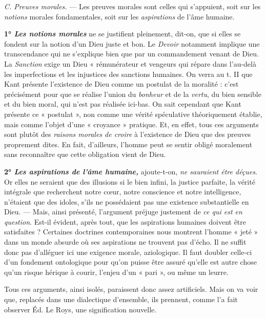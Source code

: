 {\it C. Preuves morales.} — Les preuves morales sont celles qui s’appuient,
soit sur les {\it notions} morales fondamentales, soit sur les {\it aspirations}
de l’âme humaine.

\vspace{0.24cm}
{\footnotesize
\textbf{1° \textit {\textsf{Les notions morales}}}
ne se justifient pleinement, dit-on, que si elles se
fondent sur la notion d’un Dieu juste et bon. Le {\it Devoir} notamment implique
une transcendance qui ne s'explique bien que par un commandement
venant de Dieu. La {\it Sanction} exige un Dieu « rémunérateur et vengeurs qui
répare dans l'au-delà les imperfections et les injustices des sanctions
humaines. On verra au t. II que Kant présente l’existence de Dieu comme
un postulat de la moralité : c’est précisément pour que se réalise l’union
du {\it bonheur} et de la {\it vertu}, du bien sensible et du bien moral, qui n’est pas
réalisée ici-bas. On sait cependant que Kant présente ce « postulat », non
comme une vérité spéculative théoriquement établie, mais comme l’objet
d’une « croyance » pratique. Et, en effet, tous ces arguments sont plutôt
des {\it raisons morales de croire} à l’existence de Dieu que des preuves proprement
dites. En fait, d’ailleurs, l’homme peut se sentir obligé moralement
sans reconnaître que cette obligation vient de Dieu.

\textbf{2° \textit {\textsf{Les aspirations de l'âme humaine,}}}
 ajoute-t-on, {\it ne sauraient étre déçues}. Or
elles ne seraient que des illusions si le bien infini, la justice parfaite, la
vérité intégrale que recherchent notre cœur, notre conscience et notre intelligence,
n'étaient que des idoles, s'ils ne possédaient pas une existence
substantielle en Dieu. — Mais, ainsi présenté, l'argument préjuge justement
de {\it ce qui est en question}. Est-il évident, après tout, que les aspirations
humaines doivent être satisfaites ? Certaines doctrines contemporaines nous
montrent l’homme « jeté » dans un monde absurde où ses aspirations ne
trouvent pas d’écho. Il ne suffit donc pas d’alléguer ici une exigence morale,
aziologique. Il faut doubler celle-ci d'un fondement ontologique pour qu’on
puisse être assuré qu’elle est autre chose qu’un risque hérique à courir,
l'enjeu d’un « pari », ou même un leurre.}
\vspace{0.31cm}

Tous ces arguments, ainsi isolés, paraissent donc assez artificiels.
Mais on va voir que, replacés dans une dialectique d’ensemble, ils
prennent, comme l’a fait observer Éd. Le Roys, une signification
nouvelle.


